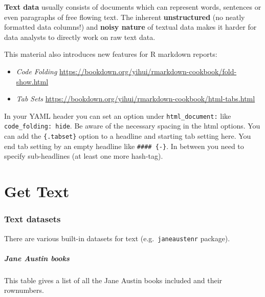 \documentclass[
]{book}
\newenvironment{Shaded}{\begin{snugshade}}{\end{snugshade}}
\newcommand{\FunctionTok}[1]{\textcolor[rgb]{0.00,0.00,0.00}{#1}}
\newcommand{\NormalTok}[1]{#1}
\newcommand{\SpecialCharTok}[1]{\textcolor[rgb]{0.00,0.00,0.00}{#1}}
\providecommand{\tightlist}{%
  \setlength{\itemsep}{0pt}\setlength{\parskip}{0pt}}
\begin{document}
\textbf{Text data} usually consists of documents which can represent words, sentences or even paragraphs of free flowing text. The inherent \textbf{unstructured} (no neatly formatted data columns!) and \textbf{noisy nature} of textual data makes it harder for data analysts to directly work on raw text data.

This material also introduces new features for R markdown reports:

\begin{itemize}
\tightlist
\item
  \emph{Code Folding} \url{https://bookdown.org/yihui/rmarkdown-cookbook/fold-show.html}
\item
  \emph{Tab Sets} \url{https://bookdown.org/yihui/rmarkdown-cookbook/html-tabs.html}
\end{itemize}

In your YAML header you can set an option under \texttt{html\_document:} like \texttt{code\_folding:\ hide}. Be aware of the necessary spacing in the html options. You can add the \texttt{\{.tabset\}} option to a headline and starting tab setting here. You end tab setting by an empty headline like \texttt{\#\#\#\#\ \{-\}}. In between you need to specify sub-headlines (at least one more hash-tag).

\hypertarget{get-text}{%
\section{Get Text}\label{get-text}}

\hypertarget{text-datasets}{%
\subsubsection{Text datasets}\label{text-datasets}}

There are various built-in datasets for text (e.g.~\texttt{janeaustenr} package).

\hypertarget{jane-austin-books}{%
\subparagraph{Jane Austin books}\label{jane-austin-books}}

This table gives a list of all the Jane Austin books included and their rownumbers.

\begin{Shaded}
\end{Shaded}
\end{document}
